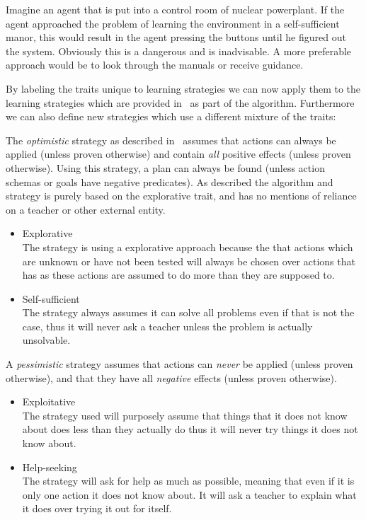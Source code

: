 \documentclass[\master/Master.tex]{subfiles}
\begin{document}
    \begin{example}
    	Imagine an agent that is put into a control room of nuclear powerplant.
    	 If the agent approached the problem of learning the environment in a self-sufficient manor, 
    	 this would result in the agent pressing the buttons until he figured out the system.
    	 Obviously this is a dangerous and is inadvisable. 
    	 A more preferable approach would be to look through the manuals or receive guidance.
    \end{example}
	By labeling the traits unique to learning strategies we can now apply them to the learning strategies which are provided in~\cite{Walsh2008} as part of the algorithm. Furthermore we can also define new strategies which use a different mixture of the traits:
    \begin{example}
		[{Optimisic}] The \emph{optimistic} strategy as described in~\cite{Walsh2008} assumes that actions
	    can always be applied (unless proven otherwise) and contain \emph{all}
	    positive effects (unless proven otherwise). Using this strategy, a
	    plan can always be found (unless action schemas or goals have negative
	    predicates). As described the algorithm and strategy is purely based on the explorative trait, and has no mentions of reliance on a teacher or other external entity.
	    \begin{itemize}
	    \item Explorative\\
	    The strategy is using a explorative approach because the that actions
	    which are unknown or have not been tested will always be chosen over
	    actions that has as these actions are assumed to do more than they
	    are supposed to.
	    \item Self-sufficient\\
	    The strategy always assumes it can solve all problems even if that
	    is not the case, thus it will never ask a teacher unless the problem
	    is actually unsolvable.
	    \end{itemize}
	\end{example}
    \begin{example}
    [{Pessimistic}] A \emph{pessimistic} strategy assumes that actions
    can \emph{never} be applied (unless proven otherwise), and that they
    have all \emph{negative} effects (unless proven otherwise).
    \begin{itemize}
    \item Exploitative\\
    The strategy used will purposely assume that things that it does not
    know about does less than they actually do thus it will never try
    things it does not know about.
    \item Help-seeking\\
    The strategy will ask for help as much as possible, meaning that even
    if it is only one action it does not know about. It will ask a teacher
    to explain what it does over trying it out for itself.
    \end{itemize}
    \end{example}
\end{document}
